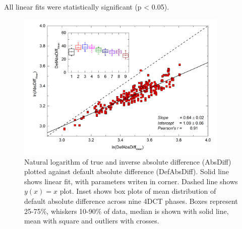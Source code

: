 \documentclass[type=dr, dr=rernat, accentcolor=tud7b,colorbacktitle, bigchapter, openright, twoside, 12pt ]{tudthesis}
\begin{document}
All linear fits were statistically significant (p < 0.05).

\begin{figure}[H]
	\begin{center}		
		\includegraphics[width=0.9\textwidth]{./Images/AbsDiff_pigs.png}
		\caption{Natural logarithm of true and inverse absolute difference (AbsDiff) plotted against default absolute difference (DefAbsDiff). Solid line shows linear fit, with parameters
		writen in corner. Dashed line shows $y(x)=x$ plot. Inset shows box plots of mean distribution of default absolute difference across nine 4DCT phases. Boxes represent 25-75\%, whiskers 10-90\%
		of data, median is shown with solid line, mean with square and outliers with crosses.}
		\label{absDiff_pigs}
	\end{center}
\end{figure}


\newpage
\end{document}
